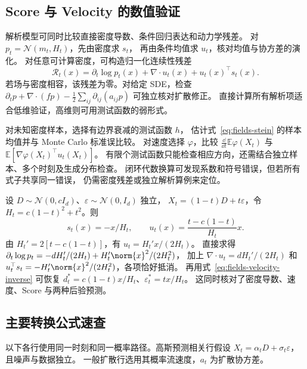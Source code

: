 \subsection{Score 与 Velocity 的数值验证}

解析模型可同时比较直接密度导数、条件回归表达和动力学残差。
对 \(p_t=\mathcal N(m_t,H_t)\)，先由密度求 \(s_t\)，
再由条件均值求 \(u_t\)，核对均值与协方差的演化。
对任意可计算密度，可构造归一化连续性残差
\begin{equation}
 \mathcal R_t(x)=\partial_t\log p_t(x)+\nabla\cdot u_t(x)+u_t(x)^\top s_t(x).
 \label{eq:fields-continuity-residual}
\end{equation}
若场与密度相容，该残差为零。对给定 SDE，检查
\(\partial_t p+\nabla\cdot(fp)-\frac12\sum_{ij}\partial_{ij}(a_{ij}p)\)
可独立核对扩散修正。
直接计算所有解析项适合低维验证，高维则可用测试函数的弱形式。

对未知密度样本，选择有边界衰减的测试函数 \(h\)，
估计式~\eqref{eq:fields-stein} 的样本均值并与 Monte Carlo 标准误比较。
对速度选择 \(\varphi\)，比较
\(\frac{\dd}{\dd t}\mathbb E\varphi(X_t)\)
与 \(\mathbb E[\nabla\varphi(X_t)^\top u_t(X_t)]\)。
有限个测试函数只能检查相应方向，还需结合独立样本、多个时刻及生成分布检查。
闭环代数换算可发现系数和符号错误，但若所有式子共享同一错误，
仍需密度残差或独立解析算例来定位。

\begin{example}[线性高斯路径的闭环核对]
设 \(D\sim\mathcal N(0,cI_d)\)、\(\varepsilon\sim\mathcal N(0,I_d)\) 独立，
\(X_t=(1-t)D+t\varepsilon\)，令 \(H_t=c(1-t)^2+t^2\)。则
\[
 s_t(x)=-x/H_t,\qquad
 u_t(x)=\frac{t-c(1-t)}{H_t}x.
\]
由 \(H_t'=2[t-c(1-t)]\)，有 \(u_t=H_t'x/(2H_t)\)。
直接求得
\(\partial_t\log p_t=-dH_t'/(2H_t)+H_t'\norm{x}^2/(2H_t^2)\)，
加上 \(\nabla\cdot u_t=dH_t'/(2H_t)\) 和
\(u_t^\top s_t=-H_t'\norm{x}^2/(2H_t^2)\)，各项恰好抵消。
再用式~\eqref{eq:fields-velocity-inverse} 可恢复
\(d_t^*=c(1-t)x/H_t\)、\(\varepsilon_t^*=tx/H_t\)。
这同时核对了密度导数、速度、Score 与两种后验预测。
\end{example}

\subsection*{主要转换公式速查}

以下各行使用同一时刻和同一概率路径。高斯预测相关行假设
\(X_t=\alpha_tD+\sigma_t\varepsilon\)，且噪声与数据独立。
一般扩散行选用其概率流速度，\(a_t\) 为扩散协方差。

